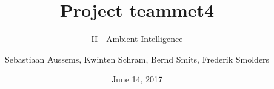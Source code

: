 

\usepackage{pgfpages}
\usepackage{lipsum}
\usepackage{comment}

\title[]{Project teammet4}
\subtitle{II - Ambient Intelligence}
\author{Sebastiaan Aussems, Kwinten Schram, Bernd Smits, Frederik Smolders}
\date{June 14, 2017}


\beamertemplatenavigationsymbolsempty 


